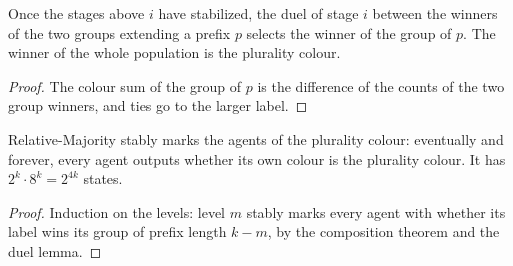 \begin{lemma}\label{lem:em-duel}
\leanok{}
Once the stages above $i$ have stabilized, the duel of stage $i$ between the winners of the two
groups extending a prefix $p$ selects the winner of the group of $p$. The winner of the whole
population is the plurality colour.
\end{lemma}
\begin{proof}\leanok
The colour sum of the group of $p$ is the difference of the counts of the two group winners, and
ties go to the larger label.
\end{proof}

\begin{theorem}\label{thm:em-relative}
\leanok{}
Relative-Majority stably marks the agents of the plurality colour: eventually and forever, every
agent outputs whether its own colour is the plurality colour. It has $2^k \cdot 8^k = 2^{4k}$
states.
\end{theorem}
\begin{proof}\leanok
Induction on the levels: level $m$ stably marks every agent with whether its label wins its group
of prefix length $k - m$, by the composition theorem and the duel lemma.
\end{proof}
